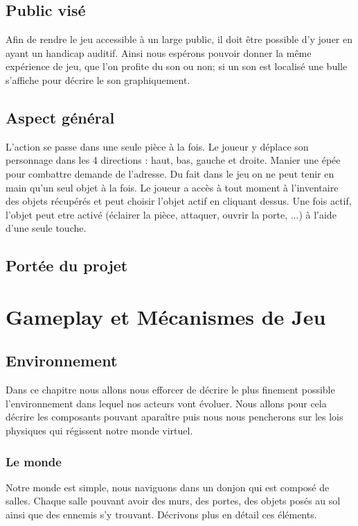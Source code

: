 \documentclass[a4paper, 11pt]{report}
\begin{document}
    \chapter{Public visé}
      Afin de rendre le jeu accessible à un large public, il doit être possible d'y jouer en ayant un handicap auditif.\newline
      Ainsi nous espérons pouvoir donner la même expérience de jeu, que l'on profite du son ou non; si un son est localisé une bulle s'affiche pour décrire le son graphiquement.

    \chapter{Aspect général}
      L'action se passe dans une seule pièce à la fois. Le joueur y déplace son personnage dans les 4 directions : haut, bas, gauche et droite.\newline
      Manier une épée pour combattre demande de l'adresse. Du fait dans le jeu on ne peut tenir en main qu'un seul objet à la fois. Le joueur a accès à tout moment à l'inventaire des objets récupérés et peut choisir l'objet actif en
      cliquant dessus. Une fois actif, l'objet peut etre activé (éclairer la pièce, attaquer, ouvrir la porte, ...) à l'aide
      d'une seule touche.

    \chapter{Portée du projet}
      

  \part{Gameplay et Mécanismes de Jeu}

    \chapter{Environnement}
      Dans ce chapitre nous allons nous efforcer de décrire le plus finement possible l'environnement dans
      lequel nos acteurs vont évoluer. Nous allons pour cela décrire les composants pouvant apara\^itre 
      puis nous nous pencherons sur les lois physiques qui régissent notre monde virtuel.

      \section{Le monde}
        Notre monde est simple, nous naviguons dans un donjon qui est composé de salles. Chaque salle 
        pouvant avoir des murs, des portes, des objets posés au sol ainsi que des ennemis s'y trouvant.
        Décrivons plus en détail ces éléments.
\end{document}
